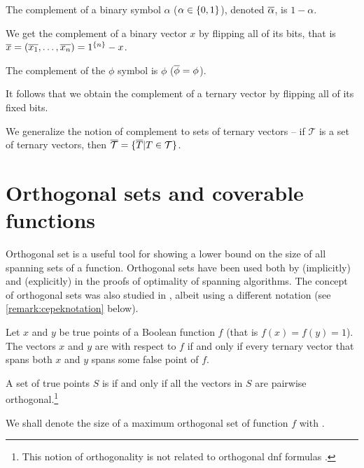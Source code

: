 \begin{definition} %
\label{def:complement}
The complement of a binary symbol $\alpha$
($\alpha \in \{0, 1\}$),
denoted $\overline{\alpha}$,
is $1 - \alpha$.

We get the complement of a binary vector $x$
by flipping all of its bits,
that is $\overline{x}
= (\overline{x_1}, \ldots, \overline{x_n})
= 1^{\{n\}} - x$.

The complement of the $\phi$ symbol is $\phi$
($\overline{\phi} = \phi$).

It follows that
we obtain the complement of a ternary vector
by flipping all of its fixed bits.

We generalize the notion of complement to sets of ternary vectors
-- if $\mathcal{T}$ is a set of ternary vectors,
then $\overline{\mathcal{T}} = \{\overline{T} | T \in \mathcal{T}\}$.
\end{definition}

\section{Orthogonal sets and coverable functions}

Orthogonal set is a useful tool
for showing a lower bound on the size of all spanning sets of a function.
Orthogonal sets have been used both
by \citet{Schieber2005154} (implicitly)
and \citet{Dubovsky2012} (explicitly)
in the proofs of optimality of spanning algorithms.
The concept of orthogonal sets was also studied
in \citet{Cepek2012},
albeit using a different notation
(see \cref{remark:cepeknotation} below).

\begin{definition}
\label{def:orthogonal}
Let $x$ and $y$ be true points of a Boolean function $f$
(that is $f(x) = f(y) = 1$).
The vectors $x$ and $y$ are 
with respect to $f$
if and only if
every ternary vector that spans both $x$ and $y$
spans some false point of $f$.

A set of true points $S$ is 
if and only if
all the vectors in $S$ are pairwise
orthogonal.\footnote{This notion of orthogonality is not related to orthogonal \acrshort{dnf} formulas \citep[Definition 1.13]{Crama2011}.}

We shall denote the size of
a maximum orthogonal set
of function $f$
with .
\end{definition}

